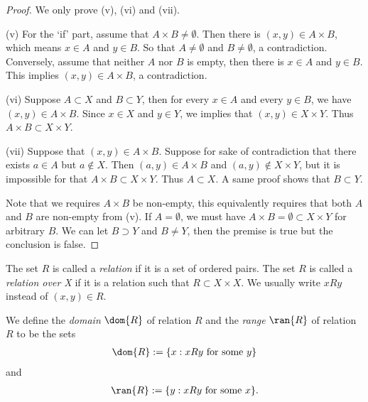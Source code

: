 \begin{proof}
    We only prove (v), (vi) and (vii).

    (v) For the `if' part, assume that $A \times B \neq \emptyset$. Then there is $(x, y) \in A \times B$, which means $x \in A$ and $y \in B$. So that $A \neq \emptyset$ and $B \neq \emptyset$, a contradiction. Conversely, assume that neither $A$ nor $B$ is empty, then there is $x \in A$ and $y \in B$. This implies $(x, y) \in A \times B$, a contradiction.

    (vi) Suppose $A \subset X$ and $B \subset Y$, then for every $x \in A$ and every $y \in B$, we have $(x, y) \in A \times B$. Since $x \in X$ and $y \in Y$, we implies that $(x, y) \in X \times Y$. Thus $A \times B \subset X \times Y$.

    (vii) Suppose that $(x, y) \in A \times B$. Suppose for sake of contradiction that there exists $a \in A$ but $a \notin X$. Then $(a, y) \in A \times B$ and $(a, y) \notin X \times Y$, but it is impossible for that $A \times B \subset X \times Y$. Thus $A \subset X$. A same proof shows that $B \subset Y$.

    Note that we requires $A \times B$ be non-empty, this equivalently requires that both $A$ and $B$ are non-empty from (v). If $A = \emptyset$, we must have $A \times B = \emptyset \subset X \times Y$ for arbitrary $B$. We can let $B \supset Y$ and $B \neq Y$, then the premise is true but the conclusion is false.
\end{proof}

\begin{definition}[Relations]

    The set $R$ is called a \emph{relation} if it is a set of ordered pairs. The set $R$ is called a \emph{relation over X} if it is a relation such that $R \subset X \times X$. We usually write $x R y$ instead of $(x, y) \in R$. 

    We define the \emph{domain} $\dom{R}$ of relation $R$ and the \emph{range} $\ran{R}$ of relation $R$ to be the sets
    \begin{align*}
        \dom{R} := \{x : x R y \text{ for some } y\}
    \end{align*}
    and
    \begin{align*}
        \ran{R} := \{y : x R y \text{ for some } x\}.
    \end{align*}
\end{definition}


